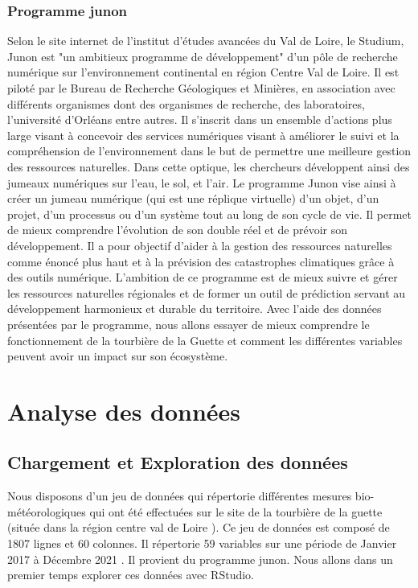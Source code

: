 \documentclass[a4paper,12pt]{report}%
\begin{document}
\section{Programme junon}


Selon le site internet de l’institut d’études avancées du Val de Loire, le Studium, Junon est "un ambitieux programme de développement"  d’un pôle de recherche numérique sur l’environnement continental en région Centre Val de Loire. Il est piloté par le Bureau de Recherche Géologiques et Minières, en association avec différents organismes dont des organismes de recherche, des laboratoires, l’université d'Orléans entre autres. Il s'inscrit dans un ensemble d’actions plus large visant à concevoir des services numériques visant à améliorer le suivi et la compréhension de l’environnement dans le but de permettre une meilleure gestion des ressources naturelles. Dans cette optique, les chercheurs développent ainsi des jumeaux numériques sur l'eau, le sol, et l'air.   	
Le programme Junon vise ainsi à créer un jumeau numérique (qui est une réplique virtuelle) d'un objet, d'un projet, d'un processus ou d'un système tout au long de son cycle de vie. Il permet de mieux comprendre l'évolution de son double réel et de prévoir son développement. Il a pour objectif d’aider à la gestion des ressources naturelles comme énoncé plus haut et à la prévision des catastrophes climatiques grâce à des outils numérique. L'ambition de ce programme est de mieux suivre et gérer les ressources naturelles régionales et de former un outil de prédiction servant au développement harmonieux et durable du territoire.
Avec l’aide des données présentées par le programme, nous allons essayer de mieux comprendre le fonctionnement de la tourbière de la Guette et comment les différentes variables peuvent avoir un impact sur son écosystème.  


\newpage

\part{Analyse des données}
\setcounter{chapter}{0}

\chapter{Chargement et Exploration des données}
Nous disposons d'un jeu de données qui répertorie différentes mesures bio-météorologiques qui ont été effectuées sur le site de la tourbière de la guette (située dans la région centre val de Loire ). Ce jeu de données est composé de 1807 lignes et 60 colonnes. Il répertorie 59 variables sur une période de Janvier 2017 à Décembre 2021 . Il provient du programme junon. Nous allons dans un premier temps explorer ces données avec RStudio.
\end{document}
